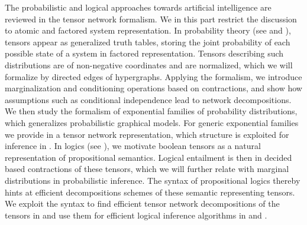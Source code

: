 The probabilistic and logical approaches towards artificial intelligence are reviewed in the tensor network formalism.
We in this part restrict the discussion to atomic and factored system representation.
In probability theory (see  and ), tensors appear as generalized truth tables, storing the joint probability of each possible state of a system in factored representation.
Tensors describing such distributions are of non-negative coordinates and are normalized, which we will formalize by directed edges of hypergraphs.
Applying the formalism, we introduce marginalization and conditioning operations based on contractions, and show how assumptions such as conditional independence lead to network decompositions.
We then study the formalism of exponential families of probability distributions, which generalizes probabilistic graphical models.
For generic exponential families we provide in  a tensor network representation, which structure is exploited for inference in .
In logics (see ), we motivate boolean tensors as a natural representation of propositional semantics.
Logical entailment is then in  decided based contractions of these tensors, which we will further relate with marginal distributions in probabilistic inference.
The syntax of propositional logics thereby hints at efficient decompositions schemes of these semantic representing tensors.
We exploit the syntax to find efficient tensor network decompositions of the tensors in  and use them for efficient logical inference algorithms in and .
